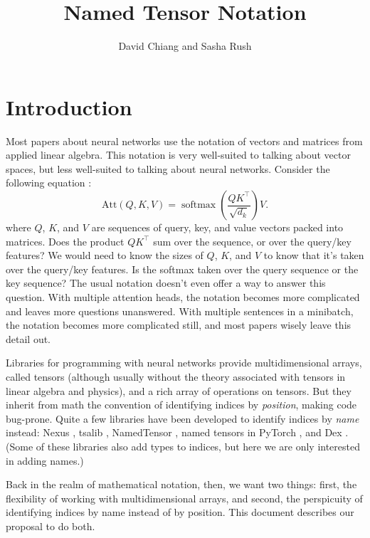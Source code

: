 \documentclass{article}
\title{Named Tensor Notation}
\author{David Chiang and Sasha Rush}
\DeclareMathOperator*{\softmax}{softmax}
\begin{document}
\maketitle

\tableofcontents

\section{Introduction}

Most papers about neural networks use the notation of vectors and matrices from applied linear algebra. This notation is very well-suited to talking about vector spaces, but less well-suited to talking about neural networks. Consider the following equation \citep{vaswani+:2017}:
\[ \text{Att}(Q, K, V) = \softmax \left( \frac{QK^\top}{\sqrt{d_k}} \right) V. \]
where $Q$, $K$, and $V$ are sequences of query, key, and value vectors packed into matrices. Does the product $QK^\top$ sum over the sequence, or over the query/key features? We would need to know the sizes of $Q$, $K$, and $V$ to know that it's taken over the query/key features. Is the softmax taken over the query sequence or the key sequence? The usual notation doesn't even offer a way to answer this question. With multiple attention heads, the notation becomes more complicated and leaves more questions unanswered. With multiple sentences in a minibatch, the notation becomes more complicated still, and most papers wisely leave this detail out.

Libraries for programming with neural networks \citep{numpy,pytorch} provide multidimensional arrays, called tensors (although usually without the theory associated with tensors in linear algebra and physics), and a rich array of operations on tensors. But they inherit from math the convention of identifying indices by \emph{position}, making code bug-prone. Quite a few libraries have been developed to identify indices by \emph{name} instead: Nexus \citep{chen2017typesafe}, tsalib \citep{tsalib}, NamedTensor \citep{namedtensor}, named tensors in PyTorch \citep{named-tensors}, and Dex \citep{maclaurin+:2019}. (Some of these libraries also add types to indices, but here we are only interested in adding names.)

Back in the realm of mathematical notation, then, we want two things: first, the flexibility of working with multidimensional arrays, and second, the perspicuity of identifying indices by name instead of by position. This document describes our proposal to do both.
\end{document}
